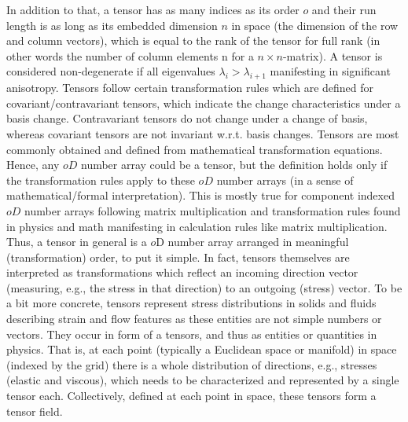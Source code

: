 \documentclass{scrartcl}
\begin{document}
In addition to that, a tensor has as many indices as its order $o$ and their run length is as long as its embedded dimension $n$ in space (the dimension of the row and column vectors), which is equal to the rank of the tensor for full rank (in other words the number of column elements n for a $n{\times}n$-matrix). A tensor is considered non-degenerate if all eigenvalues $\lambda_i>\lambda_{i+1}$ manifesting in significant anisotropy. Tensors follow certain transformation rules which are defined for covariant/contravariant tensors, which indicate the change characteristics under a basis change. Contravariant tensors do not change under a change of basis, whereas covariant tensors are not invariant w.r.t. basis changes. Tensors are most commonly obtained and defined from mathematical transformation equations. Hence, any $oD$ number array could be a tensor, but the definition holds only if the transformation rules apply to these $oD$ number arrays (in a sense of mathematical/formal interpretation). This is mostly true for component indexed $oD$ number arrays following matrix multiplication and transformation rules found in physics and math manifesting in calculation rules like matrix multiplication. Thus, a tensor in general is a $o$D number array arranged in meaningful (transformation) order, to put it simple. In fact, tensors themselves are interpreted as transformations which reflect an incoming direction vector (measuring, e.g., the stress in that direction) to an outgoing (stress) vector. To be a bit more concrete, tensors represent stress distributions in solids and fluids describing strain and flow features as these entities are not simple numbers or vectors. They occur in form of a tensors, and thus as entities or quantities in physics. That is, at each point (typically a Euclidean space or manifold) in space (indexed by the grid) there is a whole distribution of directions, e.g., stresses (elastic and viscous), which needs to be characterized and represented by a single tensor each. Collectively, defined at each point in space, these tensors form a tensor field.
\end{document}
